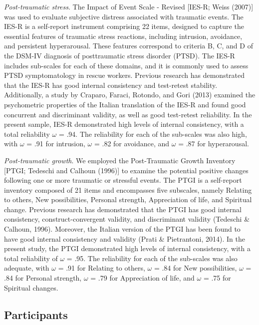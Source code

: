 \documentclass[
  man]{apa6}
\begin{document}
\emph{Post-traumatic stress}. The Impact of Event Scale - Revised {[}IES-R; Weiss (2007){]} was used to evaluate subjective distress associated with traumatic events. The IES-R is a self-report instrument comprising 22 items, designed to capture the essential features of traumatic stress reactions, including intrusion, avoidance, and persistent hyperarousal. These features correspond to criteria B, C, and D of the DSM-IV diagnosis of posttraumatic stress disorder (PTSD). The IES-R includes sub-scales for each of these domains, and it is commonly used to assess PTSD symptomatology in rescue workers. Previous research has demonstrated that the IES-R has good internal consistency and test-retest stability. Additionally, a study by Craparo, Faraci, Rotondo, and Gori (2013) examined the psychometric properties of the Italian translation of the IES-R and found good concurrent and discriminant validity, as well as good test-retest reliability.
In the present sample, IES-R demonstrated high levels of internal consistency, with a total reliability \(\omega\) = .94. The reliability for each of the sub-scales was also high, with \(\omega\) = .91 for intrusion, \(\omega\) = .82 for avoidance, and \(\omega\) = .87 for hyperarousal.

\emph{Post-traumatic growth}. We employed the Post-Traumatic Growth Inventory {[}PTGI; Tedeschi and Calhoun (1996){]} to examine the potential positive changes following one or more traumatic or stressful events. The PTGI is a self-report inventory composed of 21 items and encompasses five subscales, namely Relating to others, New possibilities, Personal strength, Appreciation of life, and Spiritual change. Previous research has demonstrated that the PTGI has good internal consistency, construct-convergent validity, and discriminant validity (Tedeschi \& Calhoun, 1996). Moreover, the Italian version of the PTGI has been found to have good internal consistency and validity (Prati \& Pietrantoni, 2014). In the present study, the PTGI demonstrated high levels of internal consistency, with a total reliability of \(\omega\) = .95. The reliability for each of the sub-scales was also adequate, with \(\omega\) = .91 for Relating to others, \(\omega\) = .84 for New possibilities, \(\omega\) = .84 for Personal strength, \(\omega\) = .79 for Appreciation of life, and \(\omega\) = .75 for Spiritual changes.

\hypertarget{participants}{%
\subsection{Participants}\label{participants}}
\end{document}
